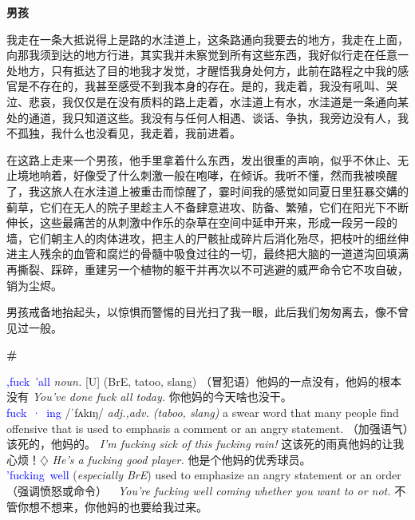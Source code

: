 \documentclass{ctexbook}
\begin{document}
\newpage
\textbf{男孩}


\mbox


    我走在一条大抵说得上是路的水洼道上，这条路通向我要去的地方，我走在上面，向那我须到达的地方行进，其实我并未察觉到所有这些东西，我好似行走在任意一处地方，只有抵达了目的地我才发觉，才醒悟我身处何方，此前在路程之中我的感官是不存在的，我甚至感受不到我本身的存在。是的，我走着，我没有吼叫、哭泣、悲哀，我仅仅是在没有质料的路上走着，水洼道上有水，水洼道是一条通向某处的通道，我只知道这些。我没有与任何人相遇、谈话、争执，我旁边没有人，我不孤独，我什么也没看见，我走着，我前进着。

    在这路上走来一个男孩，他手里拿着什么东西，发出很重的声响，似乎不休止、无止境地响着，好像受了什么刺激一般在咆哮，在倾诉。我听不懂，然而我被唤醒了，我这旅人在水洼道上被重击而惊醒了，霎时间我的感觉如同夏日里狂暴交媾的蓟草，它们在无人的院子里趁主人不备肆意进攻、防备、繁殖，它们在阳光下不断伸长，这些最痛苦的从刺激中作乐的杂草在空间中延申开来，形成一段另一段的墙，它们朝主人的肉体进攻，把主人的尸骸扯成碎片后消化殆尽，把枝叶的细丝伸进主人残余的血管和腐烂的骨髓中吸食过往的一切，最终把大脑的一道道沟回填满再撕裂、踩碎，重建另一个植物的躯干并再次以不可逃避的威严命令它不攻自破，销为尘烬。

    男孩戒备地抬起头，以惊惧而警惕的目光扫了我一眼，此后我们匆匆离去，像不曾见过一般。

\newpage
\textbf{\#}


\mbox


    \textcolor{blue}{\textsf{,fuck 'all}} {\normalsize \textsf{\emph{noun.}}} \textsf{[U] (BrE, tatoo, slang)} （冒犯语）他妈的一点没有，他妈的根本没有 \emph{You've done fuck all today.} 你他妈的今天啥也没干。
    \\


    \mbox

    
    \textcolor{blue}{\textsf{fuck\!\!\!\! · \!\!\!\! ing}} /ˈfʌkɪŋ/ {\normalsize \textsf{\emph{adj.,adv. (taboo, slang)}}} a swear word that many people find offensive that is used to emphasis a comment or an angry statement. （加强语气）该死的，他妈的。 \emph{I'm fucking sick of this fucking rain!} 这该死的雨真他妈的让我心烦！{$\diamondsuit$} \emph{He's a fucking good player.} 他是个他妈的优秀球员。
    \\


    \mbox

    
    \textcolor{blue}{\textsf{'fucking well}} (\emph{\textsf{especially BrE}}) used to emphasize an angry statement or an order （强调愤怒或命令）\ \ \emph{You're fucking well coming whether you want to or not.} 不管你想不想来，你他妈的也要给我过来。
\end{document}
